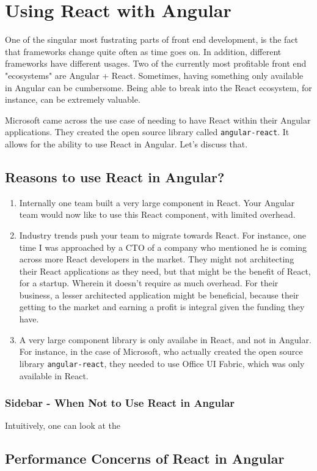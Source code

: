 \chapter{ Using React with Angular }

One of the singular most fustrating parts of front end development, is the fact
that frameworks change quite often as time goes on. In addition, different frameworks have different usages. Two of the currently most profitable front end "ecosystems" are Angular + React. Sometimes, having something only available in Angular can be cumbersome. Being able to break into the React ecosystem, for instance, can be extremely valuable. 

Microsoft came across the use case of needing to have React within their Angular applications. They created the open source library called \lstinline{angular-react}. It allows for the ability to use React in Angular. Let's discuss that.

\section{ Reasons to use React in Angular? }

\begin{enumerate}
  \item Internally one team built a very large component in React. Your Angular team would now like to use this React component, with limited overhead.  
  \item Industry trends push your team to migrate towards React. For instance, one time I was approached by a CTO of a company who mentioned he is coming across more React developers in the market. They might not architecting their React applications as they need, but that might be the benefit of React, for a startup. Wherein it doesn't require as much overhead. For their business, a lesser architected application might be beneficial, because their getting to the market and earning a profit is integral given the funding they have. 
  \item A very large component library is only availabe in React, and not in Angular. For instance, in the case of Microsoft, who actually created the open source library \lstinline{angular-react}, they needed to use Office UI Fabric, which was only available in React. 
\end{enumerate}

\subsection{Sidebar - When Not to Use React in Angular}
Intuitively, one can look at the

\section{Performance Concerns of React in Angular }

